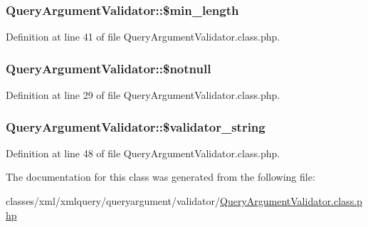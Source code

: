 \subsubsection[{\texorpdfstring{\$min\+\_\+length}{$min_length}}]{\setlength{\rightskip}{0pt plus 5cm}Query\+Argument\+Validator\+::\$min\+\_\+length}\hypertarget{classQueryArgumentValidator_a5553903c3bdf620408196db924a918c0}{}\label{classQueryArgumentValidator_a5553903c3bdf620408196db924a918c0}


Definition at line 41 of file Query\+Argument\+Validator.\+class.\+php.

\subsubsection[{\texorpdfstring{\$notnull}{$notnull}}]{\setlength{\rightskip}{0pt plus 5cm}Query\+Argument\+Validator\+::\$notnull}\hypertarget{classQueryArgumentValidator_a45e9ab83bacc4f0895f05faa3aeac81c}{}\label{classQueryArgumentValidator_a45e9ab83bacc4f0895f05faa3aeac81c}


Definition at line 29 of file Query\+Argument\+Validator.\+class.\+php.

\subsubsection[{\texorpdfstring{\$validator\+\_\+string}{$validator_string}}]{\setlength{\rightskip}{0pt plus 5cm}Query\+Argument\+Validator\+::\$validator\+\_\+string}\hypertarget{classQueryArgumentValidator_aa06a359be9617e979f903ae78537ad79}{}\label{classQueryArgumentValidator_aa06a359be9617e979f903ae78537ad79}


Definition at line 48 of file Query\+Argument\+Validator.\+class.\+php.



The documentation for this class was generated from the following file\+:\begin{DoxyCompactItemize}
\item 
classes/xml/xmlquery/queryargument/validator/\hyperlink{QueryArgumentValidator_8class_8php}{Query\+Argument\+Validator.\+class.\+php}\end{DoxyCompactItemize}

